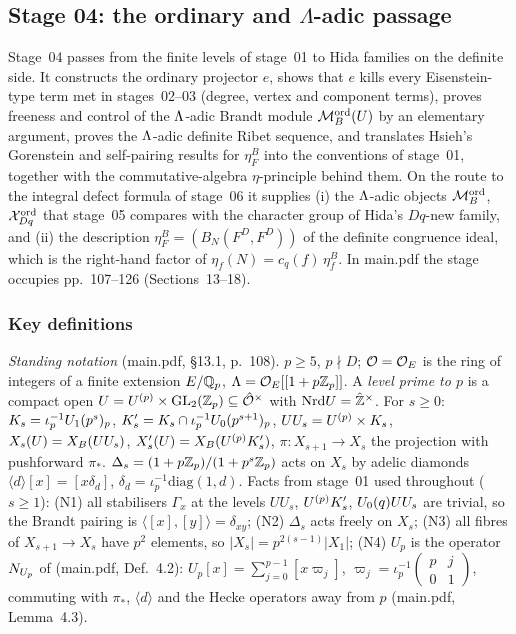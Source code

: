 \subsection{Stage 04: the ordinary and \texorpdfstring{$\Lambda$}{Lambda}-adic passage}\label{ss:stage04}
Stage~04 passes from the finite levels of stage~01 to Hida families on the definite side. It constructs the ordinary
projector $e$, shows that $e$ kills every Eisenstein-type term met in stages~02--03 (degree, vertex and component terms), proves
freeness and control of the $\Lambda$-adic Brandt module $\mathcal{M}^{\mathrm{ord}}_B(U)$ by an elementary argument, proves the $\Lambda$-adic definite
Ribet sequence, and translates Hsieh's Gorenstein and self-pairing results for $\eta^B_F$ into the conventions of stage~01,
together with the commutative-algebra $\eta$-principle behind them. On the route to the integral defect formula of stage~06 it
supplies (i) the $\Lambda$-adic objects $\mathcal{M}^{\mathrm{ord}}_B$, $\mathcal{X}^{\mathrm{ord}}_{Dq}$ that stage~05 compares with the character group of Hida's
$Dq$-new family, and (ii) the description $\eta^B_F=(B_N(F^D,F^D))$ of the definite congruence ideal, which is the
right-hand factor of $\eta_f(N)=c_q(f)\,\eta^B_f$. In main.pdf the stage occupies pp.~107--126 (Sections~13--18).

\subsubsection*{Key definitions}
\emph{Standing notation} (main.pdf, \S13.1, p.~108). $p\ge5$, $p\nmid D$; $\mathcal{O}=\mathcal{O}_E$ is the ring of integers of a finite
extension $E/\mathbb{Q}_p$, $\Lambda=\mathcal{O}_E[[1+p\mathbb{Z}_p]]$. A \emph{level prime to $p$} is a compact open $U=U^{(p)}\times\mathrm{GL}_2(\mathbb{Z}_p)\subseteq\hat{\mathcal{O}}^\times$
with $\mathrm{Nrd} U=\hat{\mathbb{Z}}^\times$. For $s\ge0$: $K_{s}=\iota_p^{-1}U_1(p^s)_p$, $K'_{s}=K_{s}\cap\iota_p^{-1}U_0(p^{s+1})_p$,
$UU_s=U^{(p)}\times K_{s}$, $X_s(U)=X_B(UU_s)$, $X'_s(U)=X_B(U^{(p)}K'_{s})$, $\pi:X_{s+1}\to X_s$ the projection with pushforward
$\pi_*$. $\Delta_s=(1+p\mathbb{Z}_p)/(1+p^s\mathbb{Z}_p)$ acts on $X_s$ by adelic diamonds $\langle d\rangle[x]=[x\delta_d]$,
$\delta_d=\iota_p^{-1}\mathrm{diag}(1,d)$. Facts from stage~01 used throughout ($s\ge1$): (N1) all stabilisers $\Gamma_x$ at the levels
$UU_s$, $U^{(p)}K'_{s}$, $U_0(q)UU_s$ are trivial, so the Brandt pairing is $\langle[x],[y]\rangle=\delta_{xy}$; (N2) $\Delta_s$ acts
freely on $X_s$; (N3) all fibres of $X_{s+1}\to X_s$ have $p^2$ elements, so $|X_s|=p^{2(s-1)}|X_1|$; (N4) $U_p$ is the operator
$N_{U_p}$ of (main.pdf, Def.~4.2): $U_p[x]=\sum_{j=0}^{p-1}[x\varpi_j]$, $\varpi_j=\iota_p^{-1}\left(\begin{smallmatrix}p&j\\0&1\end{smallmatrix}\right)$,
commuting with $\pi_*$, $\langle d\rangle$ and the Hecke operators away from $p$ (main.pdf, Lemma~4.3).

